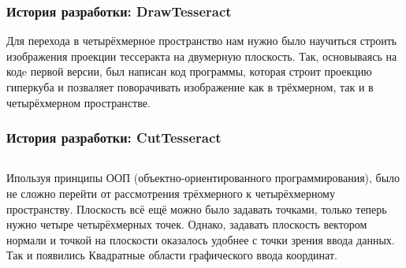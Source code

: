 \documentclass[10pt,pdf,hyperref={unicode}]{beamer}
\begin{document}
\begin{frame}
\frametitle{История разработки: {\bf DrawTesseract}}
	Для перехода в четырёхмерное пространство нам нужно 
	было научиться строить изображения проекции тессеракта на двумерную плоскость.
	Так, основываясь на кодe первой версии, был написан код программы, которая строит
	проекцию гиперкуба и позваляет поворачивать изображение как в трёхмерном, так и 
	в четырёхмерном пространстве.
\end{frame}

\begin{frame}
\frametitle{История разработки: {\bf CutTesseract}}
	\begin{columns}
		Ипользуя принципы ООП (объектно-ориентированного программирования),
		было не сложно перейти от рассмотрения трёхмерного к четырёхмерному
		пространству. Плоскость всё ещё можно было задавать точками,
		только теперь нужно четыре четырёхмерных точек. Однако, 
		задавать плоскость вектором нормали и точкой на плоскости 
		оказалось удобнее с точки зрения ввода данных.	Так 
		и появились Квадратные области графического ввода координат.
	\end{columns}
\end{frame}
\end{document}
